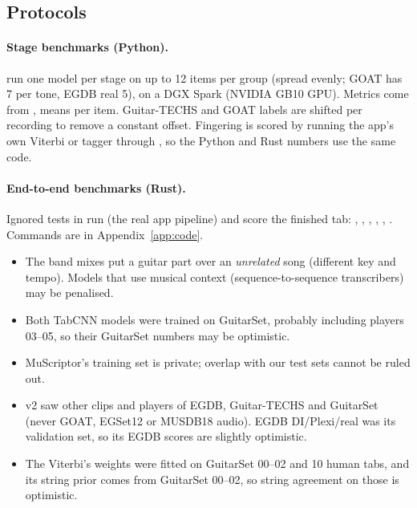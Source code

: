 \subsection{Protocols}

\paragraph{Stage benchmarks (Python).}  run one
model per stage on up to 12 items per group (spread evenly; GOAT has 7 per tone,
EGDB real 5), on a DGX Spark (NVIDIA GB10 GPU). Metrics come from
, means per item. Guitar-TECHS and GOAT labels are shifted per
recording to remove a constant offset. Fingering is scored by running the app's
own Viterbi or tagger through , so the Python
and Rust numbers use the same code.

\paragraph{End-to-end benchmarks (Rust).} Ignored tests in
 run  (the real app pipeline) and
score the finished tab: , ,
, , ,
. Commands are in Appendix~\ref{app:code}.

\begin{caution}
\begin{itemize}
\item The band mixes put a guitar part over an \emph{unrelated} song (different
  key and tempo). Models that use musical context (sequence-to-sequence
  transcribers) may be penalised.
\item Both TabCNN models were trained on GuitarSet, probably including players
  03--05, so their GuitarSet numbers may be optimistic.
\item MuScriptor's training set is private; overlap with our test sets cannot be
  ruled out.
\item v2 saw other clips and players of EGDB, Guitar-TECHS and GuitarSet (never
  GOAT, EGSet12 or MUSDB18 audio). EGDB DI/Plexi/real was its validation set,
  so its EGDB scores are slightly optimistic.
\item The Viterbi's weights were fitted on GuitarSet 00--02 and 10 human tabs,
  and its string prior comes from GuitarSet 00--02, so string agreement on
  those is optimistic.
\end{itemize}
\end{caution}


